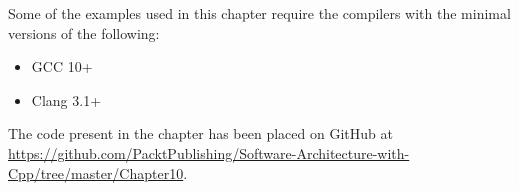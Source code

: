 
Some of the examples used in this chapter require the compilers with the minimal versions of the following:

\begin{itemize}
\item 
GCC 10+

\item 
Clang 3.1+
\end{itemize}

The code present in the chapter has been placed on GitHub at \url{https://github.com/PacktPublishing/Software-Architecture-with-Cpp/tree/master/Chapter10}.